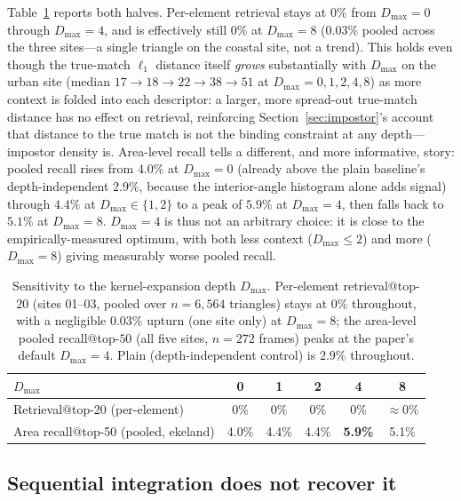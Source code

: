 \documentclass[10pt]{article}
\theoremstyle{plain}
\theoremstyle{definition}
\begin{document}
Table~\ref{tab:dmax} reports both halves. Per-element retrieval stays at
$0\%$ from $D_{\max}=0$ through $D_{\max}=4$, and is effectively still $0\%$
at $D_{\max}=8$ ($0.03\%$ pooled across the three sites---a single triangle
on the coastal site, not a trend). This holds even though the true-match
$\ell_1$ distance itself \emph{grows} substantially with $D_{\max}$ on the
urban site (median $17\to18\to22\to38\to51$ at
$D_{\max}=0,1,2,4,8$) as more context is folded into each descriptor: a
larger, more spread-out true-match distance has no effect on retrieval,
reinforcing Section~\ref{sec:impostor}'s account that distance to the true
match is not the binding constraint at any depth---impostor density is.
Area-level recall tells a different, and more informative, story: pooled
recall rises from $4.0\%$ at $D_{\max}=0$ (already above the plain
baseline's depth-independent $2.9\%$, because the interior-angle histogram
alone adds signal) through $4.4\%$ at $D_{\max}\in\{1,2\}$ to a peak of
$5.9\%$ at $D_{\max}=4$, then falls back to $5.1\%$ at $D_{\max}=8$.
$D_{\max}=4$ is thus not an arbitrary choice: it is close to the
empirically-measured optimum, with both less context ($D_{\max}\le2$) and
more ($D_{\max}=8$) giving measurably worse pooled recall.

\begin{table}[htbp]
\caption{Sensitivity to the kernel-expansion depth $D_{\max}$. Per-element
  retrieval@top-$20$ (sites 01--03, pooled over $n{=}6{,}564$ triangles)
  stays at $0\%$ throughout, with a negligible $0.03\%$ upturn (one site
  only) at $D_{\max}=8$; the area-level pooled recall@top-$50$ (all five
  sites, $n{=}272$ frames) peaks at the paper's default $D_{\max}{=}4$.
  Plain (depth-independent control) is $2.9\%$ throughout.}
\label{tab:dmax}
\centering\small
\setlength{\tabcolsep}{6pt}
\begin{tabular}{lccccc}
\toprule
\textbf{$D_{\max}$} & 0 & 1 & 2 & 4 & 8 \\
\midrule
Retrieval@top-20 (per-element) & 0\% & 0\% & 0\% & 0\% & $\approx\!0\%$ \\
Area recall@top-50 (pooled, ekeland) & 4.0\% & 4.4\% & 4.4\% & \textbf{5.9\%} & 5.1\% \\
\bottomrule
\end{tabular}
\end{table}

\subsection{Sequential integration does not recover it}
\label{sec:seq}
\end{document}
